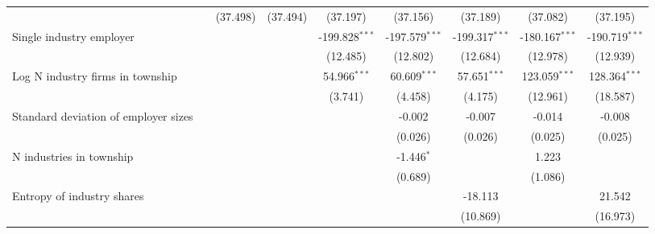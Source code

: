 \begin{tabular}{lcccccccc}
                                                         &                 & (37.498)        & (37.494)        & (37.197)         & (37.156)         & (37.189)         & (37.082)         & (37.195)\\   
   Single industry employer                              &                 &                 &                 & -199.828$^{***}$ & -197.579$^{***}$ & -199.317$^{***}$ & -180.167$^{***}$ & -190.719$^{***}$\\   
                                                         &                 &                 &                 & (12.485)         & (12.802)         & (12.684)         & (12.978)         & (12.939)\\   
   Log N industry firms in township                      &                 &                 &                 & 54.966$^{***}$   & 60.609$^{***}$   & 57.651$^{***}$   & 123.059$^{***}$  & 128.364$^{***}$\\   
                                                         &                 &                 &                 & (3.741)          & (4.458)          & (4.175)          & (12.961)         & (18.587)\\   
   Standard deviation of employer sizes                  &                 &                 &                 &                  & -0.002           & -0.007           & -0.014           & -0.008\\   
                                                         &                 &                 &                 &                  & (0.026)          & (0.026)          & (0.025)          & (0.025)\\   
   N industries in township                              &                 &                 &                 &                  & -1.446$^{*}$     &                  & 1.223            &   \\   
                                                         &                 &                 &                 &                  & (0.689)          &                  & (1.086)          &   \\   
   Entropy of industry shares                            &                 &                 &                 &                  &                  & -18.113          &                  & 21.542\\   
                                                         &                 &                 &                 &                  &                  & (10.869)         &                  & (16.973)\\   

\end{tabular}

